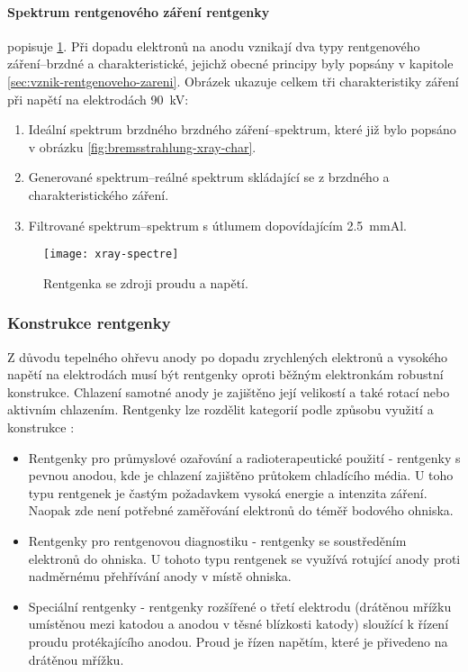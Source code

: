 \paragraph{Spektrum rentgenového záření rentgenky}
popisuje \cref{fig:xray-spectre}. Při dopadu elektronů na anodu vznikají dva typy rentgenového záření--brzdné a charakteristické, jejichž obecné principy byly popsány v kapitole \ref{sec:vznik-rentgenoveho-zareni}. Obrázek ukazuje celkem tři charakteristiky záření při napětí na elektrodách \SI{90}{\kV}:
\begin{enumerate}[label=(\alph*)]
\item Ideální spektrum brzdného brzdného záření--spektrum, které již bylo popsáno v obrázku \ref{fig:bremsstrahlung-xray-char}.
\item Generované spektrum--reálné spektrum skládající se z brzdného a charakteristického záření.
\item Filtrované spektrum--spektrum s útlumem dopovídajícím \SI{2.5}{\mm}Al.
\end{enumerate}

\begin{figure}[hb]
\centering
\texttt{[image: xray-spectre]}
\caption{Rentgenka se zdroji proudu a napětí. \cite[str. 93]{Diagnostic-Radiology-Physics}}
\label{fig:xray-spectre}
\end{figure}

\subsubsection{Konstrukce rentgenky}
Z důvodu tepelného ohřevu anody po dopadu zrychlených elektronů a vysokého napětí na elektrodách musí být rentgenky oproti běžným elektronkám robustní konstrukce. Chlazení samotné anody je zajištěno její velikostí a také rotací  nebo aktivním chlazením. Rentgenky lze rozdělit kategorií podle způsobu využití a konstrukce \cite[kap. 3.2]{AstroNuklFyzika-JadRadMetody}:
\begin{itemize}
\item Rentgenky pro průmyslové ozařování a radioterapeutické použití - rentgenky s pevnou anodou, kde je chlazení zajištěno průtokem chladícího média. U toho typu rentgenek je častým požadavkem vysoká energie a intenzita záření. Naopak zde není potřebné zaměřování elektronů do téměř bodového ohniska. 
\item Rentgenky pro rentgenovou diagnostiku - rentgenky se soustředěním elektronů do ohniska. U tohoto typu rentgenek se využívá rotující anody proti nadměrnému přehřívání anody v místě ohniska.
\item Speciální rentgenky - rentgenky rozšířené o třetí elektrodu (drátěnou mřížku umístěnou mezi katodou a anodou v těsné blízkosti katody) sloužící k řízení proudu protékajícího anodou. Proud je řízen napětím, které je přivedeno na drátěnou mřížku.
\end{itemize}

